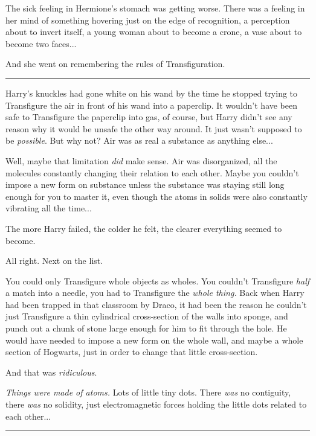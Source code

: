 The sick feeling in Hermione's stomach was getting worse. There was a
feeling in her mind of something hovering just on the edge of
recognition, a perception about to invert itself, a young woman about to
become a crone, a vase about to become two faces...

And she went on remembering the rules of Transfiguration.

\begin{center}\rule{3in}{0.4pt}\end{center}

Harry's knuckles had gone white on his wand by the time he stopped
trying to Transfigure the air in front of his wand into a paperclip. It
wouldn't have been safe to Transfigure the paperclip into gas, of
course, but Harry didn't see any reason why it would be unsafe the other
way around. It just wasn't supposed to be \emph{possible}. But why not?
Air was as real a substance as anything else...

Well, maybe that limitation \emph{did} make sense. Air was disorganized,
all the molecules constantly changing their relation to each other.
Maybe you couldn't impose a new form on substance unless the substance
was staying still long enough for you to master it, even though the
atoms in solids were also constantly vibrating all the time...

The more Harry failed, the colder he felt, the clearer everything seemed
to become.

All right. Next on the list.

You could only Transfigure whole objects as wholes. You couldn't
Transfigure \emph{half} a match into a needle, you had to Transfigure
the \emph{whole thing.} Back when Harry had been trapped in that
classroom by Draco, it had been the reason he couldn't just Transfigure
a thin cylindrical cross-section of the walls into sponge, and punch out
a chunk of stone large enough for him to fit through the hole. He would
have needed to impose a new form on the whole wall, and maybe a whole
section of Hogwarts, just in order to change that little cross-section.

And that was \emph{ridiculous}.

\emph{Things were made of atoms.} Lots of little tiny dots. There
\emph{was} no contiguity, there \emph{was} no solidity, just
electromagnetic forces holding the little dots related to each
other...

\begin{center}\rule{3in}{0.4pt}\end{center}

